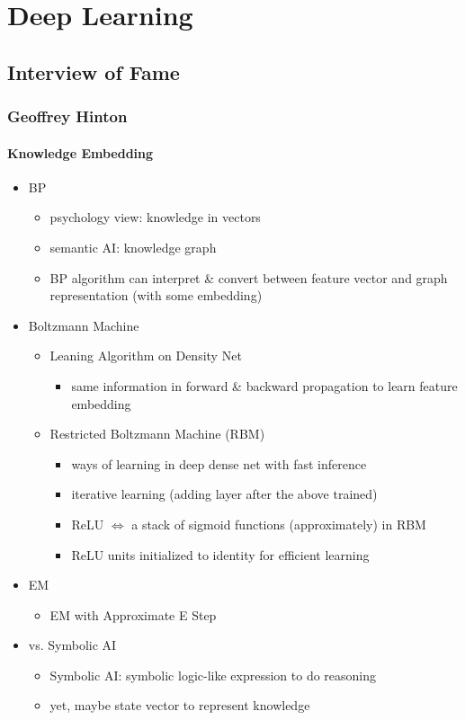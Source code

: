 \chapter{Deep Learning}

\section{Interview of Fame}

\subsection{Geoffrey Hinton}
\subsubsection{Knowledge Embedding}
\begin{itemize}
	\item BP
	\begin{itemize}
		\item psychology view: knowledge in vectors
		\item semantic AI: knowledge graph
		\item BP algorithm can interpret \& convert between feature vector and graph representation (with some embedding)
	\end{itemize}
	\item Boltzmann Machine
	\begin{itemize}
	\item Leaning Algorithm on Density Net
		\begin{itemize}
		\item same information in forward \& backward propagation to learn feature embedding
		\end{itemize}
	\item Restricted Boltzmann Machine (RBM)
		\begin{itemize}
		\item ways of learning in deep dense net with fast inference
		\item iterative learning (adding layer after the above trained)
		\item ReLU $\Leftrightarrow$ a stack of sigmoid functions (approximately) in RBM
		\item ReLU units initialized to identity for efficient learning
		\end{itemize}
	\end{itemize}
	
	\item EM
		\begin{itemize}
		\item EM with Approximate E Step
		\end{itemize}
	
	\item vs. Symbolic AI
		\begin{itemize}
		\item Symbolic AI: symbolic logic-like expression to do reasoning
		\item yet, maybe state vector to represent knowledge
		\end{itemize}
\end{itemize}

